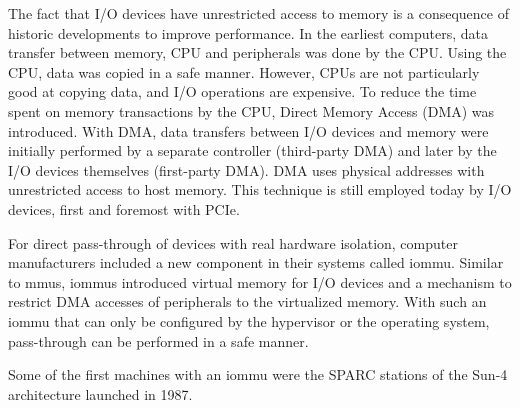 The fact that I/O devices have unrestricted access to memory is a consequence of
historic developments to improve performance. In the earliest computers, data
transfer between memory, CPU and peripherals was done by the CPU. Using the CPU,
data was copied in a safe manner. However, CPUs are not particularly good at
copying data, and I/O operations are expensive. To reduce the time spent on
memory transactions by the CPU, Direct Memory Access (DMA) was introduced. With
DMA, data transfers between I/O devices and memory were initially performed by a
separate controller (third-party DMA) and later by the I/O devices themselves
(first-party DMA). DMA uses physical addresses with unrestricted access to host
memory. This technique is still employed today by I/O devices, first and
foremost with PCIe.

For direct pass-through of devices with real hardware isolation, computer
manufacturers included a new component in their systems called \acf{iommu}.
Similar to \acp{mmu}, \acp{iommu} introduced virtual memory for I/O devices and
a mechanism to restrict DMA accesses of peripherals to the virtualized memory.
With such an \ac{iommu} that can only be configured by the hypervisor or the
operating system, pass-through can be performed in a safe manner.

Some of the first machines with an \ac{iommu} were the SPARC stations of the
Sun-4 architecture launched in 1987.

